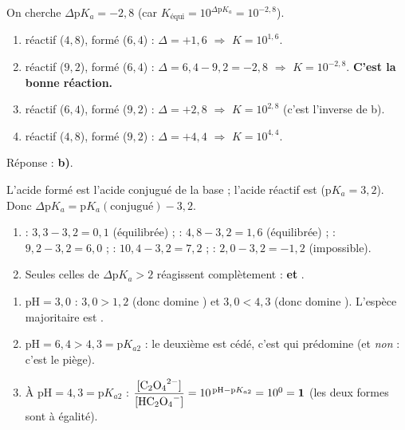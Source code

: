\documentclass[11pt,a4paper]{article}
\begin{document}
\begin{corrige}
On cherche $\Delta\mathrm{p}K_a = -2{,}8$ (car $K_{\text{équi}} = 10^{\Delta\mathrm{p}K_a} = 10^{-2{,}8}$).
\begin{enumerate}[label=\alph*)]
  \item réactif  ($4{,}8$), formé  ($6{,}4$) : $\Delta = +1{,}6$ $\Rightarrow$ $K = 10^{1{,}6}$.
  \item réactif  ($9{,}2$), formé  ($6{,}4$) : $\Delta = 6{,}4 - 9{,}2 = -2{,}8$ $\Rightarrow$
        $\boxed{K = 10^{-2{,}8}}$. \textbf{C'est la bonne réaction.}
  \item réactif  ($6{,}4$), formé  ($9{,}2$) : $\Delta = +2{,}8$ $\Rightarrow$ $K = 10^{2{,}8}$ (c'est l'inverse de b).
  \item réactif  ($4{,}8$), formé  ($9{,}2$) : $\Delta = +4{,}4$ $\Rightarrow$ $K = 10^{4{,}4}$.
\end{enumerate}
Réponse : \textbf{b)}.
\end{corrige}

\begin{corrige}
L'acide formé est l'acide conjugué de la base ; l'acide réactif est  ($\mathrm{p}K_a = 3{,}2$). Donc
$\Delta\mathrm{p}K_a = \mathrm{p}K_a(\text{conjugué}) - 3{,}2$.
\begin{enumerate}[label=\alph*)]
  \item {} : $3{,}3 - 3{,}2 = 0{,}1$ (équilibrée) ;\quad {} : $4{,}8 - 3{,}2 = 1{,}6$ (équilibrée) ;\quad
         : $9{,}2 - 3{,}2 = 6{,}0$ ;\quad {} : $10{,}4 - 3{,}2 = 7{,}2$ ;\quad
         : $2{,}0 - 3{,}2 = -1{,}2$ (impossible).
  \item Seules celles de $\Delta\mathrm{p}K_a > 2$ réagissent complètement : \textbf{ et }.
\end{enumerate}
\end{corrige}

\begin{corrige}
\begin{enumerate}[label=\alph*)]
  \item $\mathrm{pH} = 3{,}0$ : $3{,}0 > 1{,}2$ (donc  domine ) et $3{,}0 < 4{,}3$ (donc
         domine ). L'espèce majoritaire est \textbf{}.
  \item $\mathrm{pH} = 6{,}4 > 4{,}3 = \mathrm{p}K_{a2}$ : le deuxième  est cédé, c'est
        \textbf{} qui prédomine (et \emph{non}  : c'est le piège).
  \item À $\mathrm{pH} = 4{,}3 = \mathrm{p}K_{a2}$ : $\dfrac{[\ce{C2O4^{2-}}]}{[\ce{HC2O4-}]}
        = 10^{\,\mathrm{pH}-\mathrm{p}K_{a2}} = 10^{0} = \mathbf{1}$ (les deux formes sont à égalité).
\end{enumerate}
\end{corrige}
\end{document}
